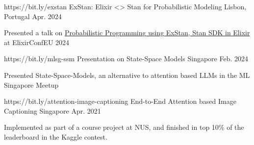 


\begin{cventries}


  \cventry
    {https://bit.ly/exstan}
    {ExStan: Elixir <> Stan for Probabilistic Modeling} %
    {Lisbon, Portugal} %
    {Apr. 2024} %
    {
      \begin{cvitems} %
        \item {Presented a talk on \href{https://github.com/goodhamgupta/ex_stan}{Probabilistic Programming using ExStan, Stan SDK in Elixir} at ElixirConfEU 2024 }
      \end{cvitems}
    }

  \cventry
    {https://bit.ly/mlsg-ssm}
    {Presentation on State-Space Models} %
    {Singapore} %
    {Feb. 2024} %
    {
      \begin{cvitems} %
        \item {Presented State-Space-Models, an alternative to attention based LLMs in the ML Singapore Meetup }
      \end{cvitems}
    }


  \cventry
    {https://bit.ly/attention-image-captioning}
    {End-to-End Attention based Image Captioning} %
    {Singapore} %
    {Apr. 2021} %
    {
      \begin{cvitems} %
        \item {Implemented as part of a course project at NUS, and finished in top 10\% of the leaderboard in the Kaggle contest. }
      \end{cvitems}
    }


\end{cventries}
